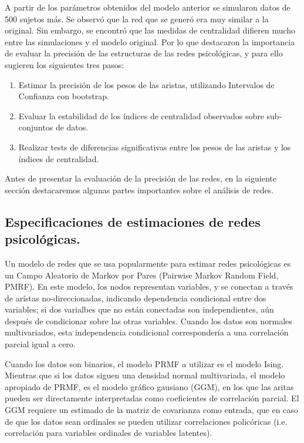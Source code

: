 \documentclass[11pt,spanish]{article}\usepackage[]{graphicx}\usepackage[]{color}
\begin{document}
A partir de los parámetros obtenidos del modelo anterior se simularon datos de 500 sujetos más. Se observó que la red que se generó era muy similar a la original. Sin embargo, se encontró que las medidas de centralidad difieren mucho entre las simulaciones y el modelo original. Por lo que destacaron la importancia de evaluar la precisión de las estructuras de las redes psicológicas, y para ello sugieren los siguientes tres pasos: 

\begin{enumerate}
  \item Estimar la precisión de los pesos de las aristas, utilizando Intervalos de Confianza con bootstrap.
  \item Evaluar la estabilidad de los índices de centralidad observados sobre sub-conjuntos de datos.
  \item Realizar tests de diferencias significativas entre los pesos de las aristas y los índices de centralidad. 
\end{enumerate}

Antes de presentar la evaluación de la precisión de las redes, en la siguiente sección destacaremos algunas partes importantes sobre el análisis de redes.

\subsection*{Especificaciones de estimaciones de redes psicológicas.}

Un modelo de redes que se usa popularmente para estimar redes psicológicas es un Campo Aleatorio de Markov por Pares (Pairwise Markov Random Field, PMRF). En este modelo, los nodos representan variables, y se conectan a través de arístas no-direccionadas, indicando dependencia condicional entre dos variables; si dos varialbes que no están conectadas son independientes, aún después de condicionar sobre las otras variables. Cuando los datos son normales multivariados, esta independencia condicional correspondería a una correlación parcial igual a cero. 

Cuando los datos son binarios, el modelo PRMF a utilizar es el modelo Ising. Mientras que si los datos siguen una densidad normal multivariada, el modelo apropiado de PRMF, es el modelo gráfico gausiano (GGM), en los que las aritas pueden ser directamente interpretadas como coeficientes de correlación parcial. El GGM requiere un estimado de la matriz de covarianza como entrada, que en caso de que los datos sean ordinales se pueden utilizar correlaciones policóricas (i.e. correlación para variables ordinales de variables latentes).
\end{document}
